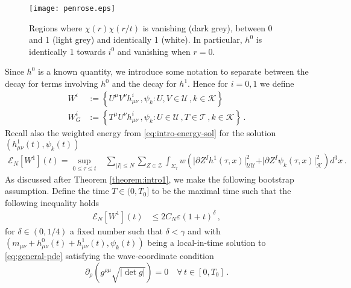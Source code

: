 \documentclass[11pt, a4paper]{amsart}
\numberwithin{equation}{section}
\numberwithin{theorem}{section}
\newcommand{\p}{\partial}
\newcommand{\mn}{{\mu \nu}}
\newcommand{\UU}{{\mathcal{U} \mathcal{U}}}
\newcommand{\K}{\mathcal{K}}
\begin{document}
\begin{figure}[h] 
\texttt{[image: penrose.eps]}
\caption{Regions where $\chi(r) \chi(r/t)$ is vanishing (dark grey), between 0 and 1 (light grey) and identically 1 (white). In particular, $h^0$ is identically 1 towards $i^0$ and vanishing when $r=0$. }
\label{fig:h0}
\end{figure}

Since $h^0$ is a known quantity, we introduce some notation to separate between the decay for terms involving $h^0$ and the decay for $h^1$. Hence for $i=0,1$ we define
\begin{equation} \begin{split}
W^i & := \left\lbrace U^\mu V^\nu h^i_\mn \,, \psi_k : U, V \in \mathcal{U}  \,, k \in \K \right\rbrace  \\
W_G^i &:=  \left\lbrace T^\mu U^\nu h^i_\mn \,, \psi_k : U \in \mathcal{U} \,, T \in \mathcal{T} \,, k \in \K \right\rbrace \,.
\end{split} \label{eq:def-Wi-Yi} \end{equation}
Recall also the weighted energy from \eqref{eq:intro-energy-sol} for the solution $(h^1_\mn(t), \psi_k(t))$
\begin{equation} \begin{split} \mathcal{E}_N [W^1](t)  = \sup_{0 \leq \tau \leq t} & \sum_{\vert I \vert \leq N} \sum_{Z \in \mathcal{Z}} \int_{\Sigma_\tau} w \left( \vert \p Z^I h^1 (\tau, x ) \vert_\UU^2+  \vert \p Z^I \psi_k(\tau, x ) \vert_\K^2\right) d^3 x \,. \label{eq:def-weighted-energy}
\end{split} \end{equation}
As discussed after Theorem \ref{theorem:intro1}, we make the following bootstrap assumption. Define the time $T \in (0, T_0]$ to be the maximal time such that the following inequality holds
\begin{equation} \begin{split}
\mathcal{E}_N [W^1](t) & \leq 2 C_N \varepsilon (1+t)^\delta \,, 
\end{split} \label{eq:growth-control-h1}
\end{equation}
for $\delta \in (0, 1/4)$ a fixed number such that $ \delta < \gamma$ and with $(m_\mn + h^0_\mn (t)+ h^1_\mn(t), \psi_k(t))$ being a local-in-time solution to \eqref{eq:general-pde} satisfying the wave-coordinate condition 
\begin{equation}
\p_\rho \left( g^{\rho \mu} \sqrt{\vert \det g \vert} \right) = 0  \quad \forall \, t \in [0, T_0] \,. \label{eq:wave-coord}
\end{equation}
\end{document}
